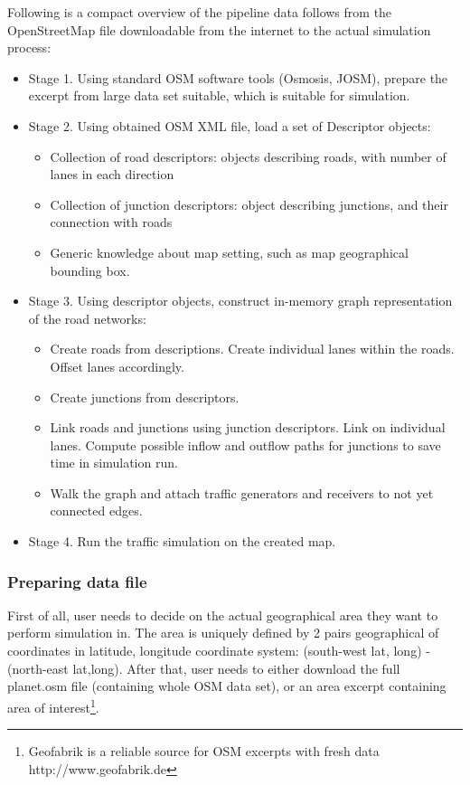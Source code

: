 Following is a compact overview of the pipeline data follows from the OpenStreetMap file downloadable from the internet to the actual simulation process:
\begin{itemize}
    \item Stage 1. Using standard OSM software tools (Osmosis, JOSM), prepare the excerpt from large data set suitable, which is suitable for simulation.

    \item Stage 2. Using obtained OSM XML file, load a set of Descriptor objects:
    \begin{itemize}
        \item Collection of road descriptors: objects describing roads, with number of lanes in each direction
        \item Collection of junction descriptors: object describing junctions, and their connection with roads
        \item Generic knowledge about map setting, such as map geographical bounding box.
    \end{itemize}

    \item Stage 3. Using descriptor objects, construct in-memory graph representation of the road networks:
    \begin{itemize}
        \item Create roads from descriptions. Create individual lanes within the roads. Offset lanes accordingly.
        \item Create junctions from descriptors.
        \item Link roads and junctions using junction descriptors. Link on individual lanes. Compute possible inflow and outflow paths for junctions to save time in simulation run.
        \item Walk the graph and attach traffic generators and receivers to not yet connected edges.
    \end{itemize}

    \item Stage 4. Run the traffic simulation on the created map.
\end{itemize}

\subsubsection{Preparing data file}
First of all, user needs to decide on the actual geographical area they want to perform simulation in. The area is uniquely defined by 2 pairs geographical of coordinates in latitude, longitude coordinate system: (south-west lat, long) - (north-east lat,long). After that, user needs to either download the full planet.osm file (containing whole OSM data set), or an area excerpt containing area of interest\footnote{Geofabrik is a reliable source for OSM excerpts with fresh data http://www.geofabrik.de}.

